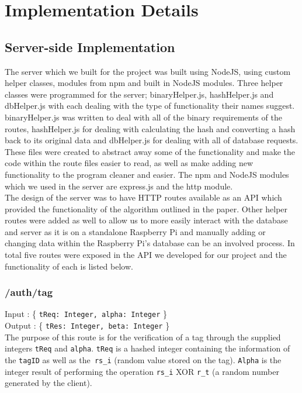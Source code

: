 \section{Implementation Details}

\subsection{Server-side Implementation}
\label{srv-side-imp}
The server which we built for the project was built using NodeJS, using custom helper classes, modules from npm and built in NodeJS modules. Three helper classes were programmed for the server; binaryHelper.js, hashHelper.js and dbHelper.js with each dealing with the type of functionality their names suggest. binaryHelper.js was written to deal with all of the binary requirements of the routes, hashHelper.js for dealing with calculating the hash and converting a hash back to its original data and dbHelper.js for dealing with all of database requests. These files were created to abstract away some of the functionality and make the code within the route files easier to read, as well as make adding new functionality to the program cleaner and easier. The npm and NodeJS modules which we used in the server are express.js and the http module.\\
 
The design of the server was to have HTTP routes available as an API which provided the functionality of the algorithm outlined in the paper. Other helper routes were added as well to allow us to more easily interact with the database and server as it is on a standalone Raspberry Pi and manually adding or changing data within the Raspberry Pi’s database can be an involved process. In total five routes were exposed in the API we developed for our project and the functionality of each is listed below.
 
\subsubsection{/auth/tag}

Input : \{ \verb|tReq: Integer, alpha: Integer| \}\\
Output : \{ \verb|tRes: Integer, beta: Integer| \}\\
 
The purpose of this route is for the verification of a tag through the supplied integers \verb|tReq| and \verb|alpha|. \verb|tReq| is a hashed integer containing the information of the \verb|tagID| as well as the\verb| rs_i| (random value stored on the tag). \verb|Alpha| is the integer result of performing the operation \verb|rs_i| XOR \verb|r_t| (a random number generated by the client).\\
 

